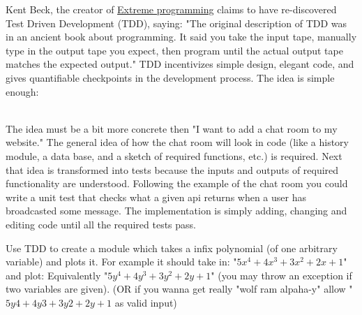 \documentclass[nociteref]{../../SIAM-GH-book}
\begin{document}
Kent Beck, the creator of \href{https://en.wikipedia.org/wiki/Extreme_programming}{Extreme programming} claims to have re-discovered  Test Driven Development (TDD), saying:
"The original description of TDD was in an ancient book about programming. It said you take the input tape, manually type in the output tape you expect, then program until the actual output tape matches the expected output."
TDD incentivizes simple design, elegant code, and gives quantifiable checkpoints in the development process.
The idea is simple enough:
\\
The idea must be a bit more concrete then "I want to add a chat room to my website." The general idea of how the chat room will look in code (like a history module, a data base, and a sketch of required functions, etc.) is required.
Next that idea is transformed into tests because the inputs and outputs of required functionality are understood.
Following the example of the chat room you could write a unit test that checks what a given api returns when a user has broadcasted some message.
The implementation is simply adding, changing and editing code until all the required tests pass.

\begin{problem}
Use TDD to create a module which takes a infix polynomial (of one arbitrary variable) and plots it. For example it should take in:
"$5x^4 + 4x^3 + 3x^2+ 2x + 1$" and plot:
Equivalently "$5y^4 + 4y^3 + 3y^2+ 2y + 1$" (you may throw an exception if two variables are given).
(OR if you wanna get really "wolf ram alpaha-y" allow "$5y4 + 4y3 + 3y2+ 2y + 1$ as valid input)
\end{problem}
\end{document}
